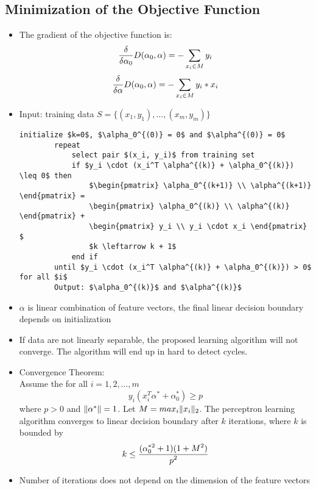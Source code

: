 \subsection*{Minimization of the Objective Function}
\begin{itemize}
    \item
        The gradient of the objective function is:
        $$\frac{\displaystyle \delta}{\displaystyle \delta \alpha_0} D(\alpha_0, \alpha) = - \sum_{x_i \in M} y_i$$ 
        $$\frac{\displaystyle \delta}{\displaystyle \delta \alpha} D(\alpha_0, \alpha) = - \sum_{x_i \in M} y_i * x_i$$
    \item
        Input: training data $S = \{(x_1, y_1), \dots, (x_m, y_m)\}$
        \begin{lstlisting}[mathescape]
        initialize $k=0$, $\alpha_0^{(0)} = 0$ and $\alpha^{(0)} = 0$
        repeat
            select pair $(x_i, y_i)$ from training set
            if $y_i \cdot (x_i^T \alpha^{(k)} + \alpha_0^{(k)}) \leq 0$ then
                $\begin{pmatrix} \alpha_0^{(k+1)} \\ \alpha^{(k+1)} \end{pmatrix} =
                \begin{pmatrix} \alpha_0^{(k)} \\ \alpha^{(k)} \end{pmatrix} + 
                \begin{pmatrix} y_i \\ y_i \cdot x_i \end{pmatrix} $
                $k \leftarrow k + 1$
            end if
        until $y_i \cdot (x_i^T \alpha^{(k)} + \alpha_0^{(k)}) > 0$ for all $i$
        Output: $\alpha_0^{(k)}$ and $\alpha^{(k)}$
        \end{lstlisting}
    \item
        $\alpha$ is linear combination of feature vectors, the final linear decision boundary depends on initialization
    \item
        If data are not linearly separable, the proposed learning algorithm will not converge. The algorithm will end up in hard to detect cycles.
    \item
        Convergence Theorem:\\
        Assume the for all $i = 1,2,\dots,m$
        $$ y_i (x_i^T \alpha^* + \alpha_0^*) \geq p $$
        where $p > 0$ and $\lVert\alpha^*\rVert = 1$. Let $M = max_i \lVert x_i\rVert_2$.
        The perceptron learning algorithm converges to linear decision boundary after $k$ iterations, where $k$ is bounded by
        $$ k \leq \frac{\displaystyle (\alpha_0^{*2} + 1)(1+M^2)}{\displaystyle p^2} $$
    \item
        Number of iterations does not depend on the dimension of the feature vectors
\end{itemize}


